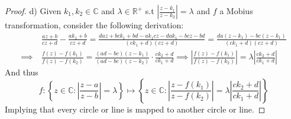 \documentclass{article}
\newcommand{\bb}[1]{\mathbb{#1}}
\begin{document}
\begin{proof}
  d) Given $k_{1},k_{2} \in \bb{C}$ and $\lambda \in \bb{R}^{+}$ s.t $|\frac{z-k_{1}}{z-k_{2}}| = \lambda$ and $f$ a Mobius transformation, consider the following derivation:
  \begin{align*}
    & \frac{az + b}{cz + d} - \frac{ak_{1}+b}{cz+d} = \frac{daz + bck_{1} + bd -ak_{1}cz - dak_{1} -bcz - bd}{(ck_{1}+d)(cz+d)} = \frac{da(z-k_{1}) - bc(z-k_{1})}{(ck_{1}+d)(cz+d)} \\
      \implies \ & \frac{f(z) - f(k_{1})}{f(z) - f(k_{2})} = \frac{(ad-bc)(z-k_{1})}{(ad-bc)(z-k_{2})} \cdot \frac{ck_{2}+d}{ck_{1} + d} \implies \left| \frac{f(z)-f(k_{1})}{f(z) - f(k_{2})}\right| = \lambda \left|\frac{ck_{2}+d}{ck_{1}+d}\right|
  \end{align*}
  And thus \[ f: \left\{ z \in \bb{C} : \left| \frac{z-a}{z-b} \right| = \lambda\right\} \mapsto \left\{ z \in \bb{C} : \left| \frac{z-f(k_{1})}{z-f(k_{2})} \right| = \lambda\left|\frac{ck_{2}+d}{ck_{1}+d}\right| \right \} \]
  Implying that every circle or line is mapped to another circle or line.
\end{proof}
\end{document}
